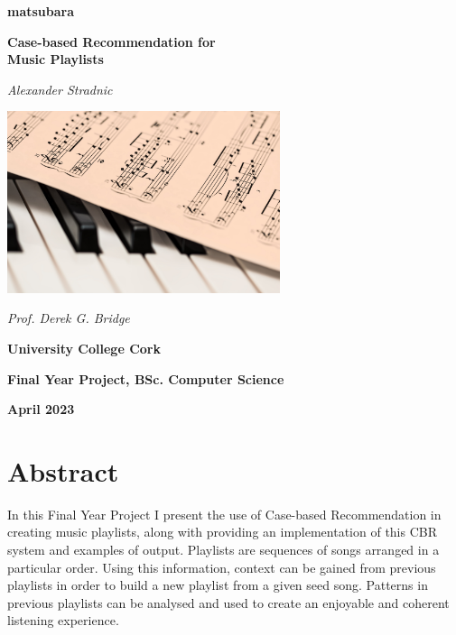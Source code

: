 \documentclass[a4paper, 12pt]{report}
\begin{document}
\begin{titlepage}
    \begin{center}
        \vspace*{1cm}

        \Large{
            \textbf{matsubara}
        
            \textbf{Case-based Recommendation for \\ Music Playlists}
        
            \vspace{0.5cm}
        
            \textit{Alexander Stradnic}
        
            \vspace{3cm}
        
            \includegraphics[width=0.6\textwidth]{piano.jpg}
        
            \vspace{3cm}
        
            \textit{Prof. Derek G. Bridge}
        
            \vspace{0.5cm}
        
            \textbf{University College Cork}
        
            \textbf{Final Year Project, BSc. Computer Science}
            
            \textbf{April 2023}
        }
    \end{center}
\end{titlepage}

\chapter*{Abstract}
In this Final Year Project I present the use of Case-based Recommendation in creating music playlists, 
along with providing an implementation of this CBR system and examples of output.
Playlists are sequences of songs arranged in a particular order. Using this information, 
context can be gained from previous playlists in order to build a new playlist from a given seed song. 
Patterns in previous playlists can be analysed and used to create an enjoyable and coherent listening experience.
\end{document}
